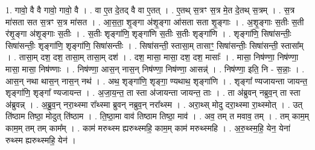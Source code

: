 \documentclass[17pt]{extarticle}
\begin{document}
1. गावो॒ वै वै गावो॒ गावो॒ वै । . वा ए॒त दे॒तद् वै वा ए॒तत् । . ए॒तथ् स॒त्रꣳ स॒त्र मे॒त दे॒तथ् स॒त्रम् । . स॒त्र मा॑सता सत स॒त्रꣳ स॒त्र मा॑सत । . आ॒स॒ता॒ शृ॒ङ्गा अ॑शृ॒ङ्गा आ॑सता सता शृ॒ङ्गाः । . अ॒शृ॒ङ्गाः स॒तीः स॒ती र॑शृ॒ङ्गा अ॑शृ॒ङ्गाः स॒तीः । . स॒तीः शृङ्गा॑णि॒ शृङ्गा॑णि स॒तीः स॒तीः शृङ्गा॑णि । . शृङ्गा॑णि॒ सिषा॑सन्तीः॒ सिषा॑सन्तीः॒ शृङ्गा॑णि॒ शृङ्गा॑णि॒ सिषा॑सन्तीः । . सिषा॑सन्ती॒ स्तासा॒म् तासाꣳ॒॒ सिषा॑सन्तीः॒ सिषा॑सन्ती॒ स्तासा᳚म् । . तासा॒म् दश॒ दश॒ तासा॒म् तासा॒म् दश॑ । . दश॒ मासा॒ मासा॒ दश॒ दश॒ मासाः᳚ । . मासा॒ निष॑ण्णा॒ निष॑ण्णा॒ मासा॒ मासा॒ निष॑ण्णाः । . निष॑ण्णा॒ आस॒न् नास॒न् निष॑ण्णा॒ निष॑ण्णा॒ आसन्न्॑ । . निष॑ण्णा॒ इति॒ नि - स॒न्नाः॒ । . आस॒न् नथा थास॒न् नास॒न् नथ॑ । . अथ॒ शृङ्गा॑णि॒ शृङ्गा॒ ण्यथाथ॒ शृङ्गा॑णि । . शृङ्गा᳚ ण्यजायन्ता जायन्त॒ शृङ्गा॑णि॒ शृङ्गा᳚ ण्यजायन्त । . अ॒जा॒य॒न्त॒ ता स्ता अ॑जायन्ता जायन्त॒ ताः । . ता अ॑ब्रुवन् नब्रुव॒न् ता स्ता अ॑ब्रुवन्न् । . अ॒ब्रु॒व॒न् नरा॒थ्स्मा रा᳚थ्स्मा ब्रुवन् नब्रुव॒न् नरा᳚थ्स्म । . अरा॒थ्स् मोदु दरा॒थ्स्मा रा॒थ्स्मोत् । . उत् ति॑ष्ठाम तिष्ठा॒ मोदुत् ति॑ष्ठाम । . ति॒ष्ठा॒मा वाव॑ तिष्ठाम तिष्ठा॒ माव॑ । . अव॒ तम् त मवाव॒ तम् । . तम् काम॒म् काम॒म् तम् तम् काम᳚म् । . काम॑ मरुथ्स्म ह्यरुथ्स्महि॒ काम॒म् काम॑ मरुथ्स्महि । . अ॒रु॒थ्स्म॒हि॒ येन॒ येना॑ रुथ्स्म ह्यरुथ्स्महि॒ येन॑ । \newline
\end{document}
